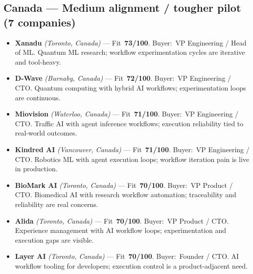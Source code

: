 \documentclass[10pt]{article}
\newcommand{\cand}[5]{\item \textbf{#1} \textit{(#2)} --- Fit~\textbf{#3/100}. Buyer:~#4. #5}
\begin{document}
\subsection{Canada --- Medium alignment / tougher pilot (7 companies)}
\begin{itemize}
\cand{Xanadu}{Toronto, Canada}{73}{VP Engineering / Head of ML}{Quantum ML research; workflow experimentation cycles are iterative and tool-heavy.}
\cand{D-Wave}{Burnaby, Canada}{72}{VP Engineering / CTO}{Quantum computing with hybrid AI workflows; experimentation loops are continuous.}
\cand{Miovision}{Waterloo, Canada}{71}{VP Engineering / CTO}{Traffic AI with agent inference workflows; execution reliability tied to real-world outcomes.}
\cand{Kindred AI}{Vancouver, Canada}{71}{VP Engineering / CTO}{Robotics ML with agent execution loops; workflow iteration pain is live in production.}
\cand{BioMark AI}{Toronto, Canada}{70}{VP Product / CTO}{Biomedical AI with research workflow automation; traceability and reliability are real concerns.}
\cand{Alida}{Toronto, Canada}{70}{VP Product / CTO}{Experience management with AI workflow loops; experimentation and execution gaps are visible.}
\cand{Layer AI}{Toronto, Canada}{70}{Founder / CTO}{AI workflow tooling for developers; execution control is a product-adjacent need.}
\end{itemize}
\end{document}
